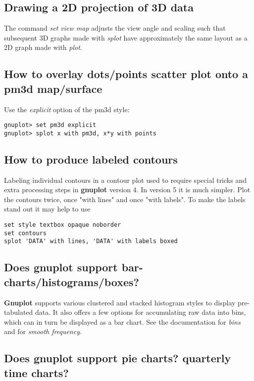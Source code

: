\documentclass[a4paper,11pt]{article}
\newcommand{\gnuplot}{\textbf{gnuplot }}
\newcommand{\Gnuplot}{\textbf{Gnuplot }}
\begin{document}
\subsection{Drawing a 2D projection of 3D data}

The command {\em set view map} adjusts the view angle and scaling such
that subsequent 3D graphs made with {\em splot} have approximately the same layout
as a 2D graph made with {\em plot}.

\subsection{How to overlay dots/points scatter plot onto a pm3d map/surface}

Use the {\em explicit} option of the pm3d style:
\small
\begin{verbatim}
gnuplot> set pm3d explicit
gnuplot> splot x with pm3d, x*y with points
\end{verbatim}
\normalsize


\subsection{How to produce labeled contours}

Labeling individual contours in a contour plot used to require special
tricks and extra processing steps in \gnuplot version 4.
In version 5 it is much simpler.  Plot the contours twice,
once "with lines" and once "with labels".  To make the labels stand out
it may help to use
\begin{verbatim}
set style textbox opaque noborder
set contours
splot 'DATA' with lines, 'DATA' with labels boxed
\end{verbatim}

\subsection{Does \gnuplot support bar-charts/histograms/boxes?}

\Gnuplot{} supports various clustered and stacked histogram styles to display
pre-tabulated data.  It also offers a few options for accumulating raw data
into bins, which can in turn be displayed as a bar chart.  See the documentation
for \textit{bins} and for \textit{smooth frequency}.

\subsection{Does \gnuplot support pie charts? quarterly time charts?}
\end{document}
